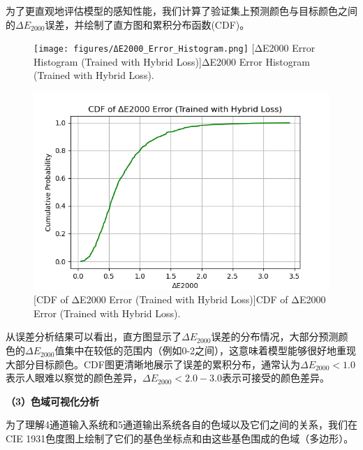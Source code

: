 为了更直观地评估模型的感知性能，我们计算了验证集上预测颜色与目标颜色之间的$\Delta E_{2000}$误差，并绘制了直方图和累积分布函数(CDF)。

\begin{figure}[H]
\centering
{}
\texttt{[image: figures/ΔE2000\_Error\_Histogram.png]}
[ΔE2000 Error Histogram (Trained with Hybrid Loss)]{ΔE2000 Error Histogram (Trained with Hybrid Loss).}
\label{figure2: delta_e_histogram}
\end{figure}

\begin{figure}[H]
\centering
{}
\includegraphics[width=0.8\columnwidth]{figures/CDF.png}
[CDF of ΔE2000 Error (Trained with Hybrid Loss)]{CDF of ΔE2000 Error (Trained with Hybrid Loss).}
\label{figure2: delta_e_cdf}
\end{figure}

从误差分析结果可以看出，直方图显示了$\Delta E_{2000}$误差的分布情况，大部分预测颜色的$\Delta E_{2000}$值集中在较低的范围内（例如0-2之间），这意味着模型能够很好地重现大部分目标颜色。CDF图更清晰地展示了误差的累积分布，通常认为$\Delta E_{2000} < 1.0$表示人眼难以察觉的颜色差异，$\Delta E_{2000} < 2.0-3.0$表示可接受的颜色差异。

\noindent\textbf{（3）色域可视化分析}

为了理解4通道输入系统和5通道输出系统各自的色域以及它们之间的关系，我们在CIE 1931色度图上绘制了它们的基色坐标点和由这些基色围成的色域（多边形）。

